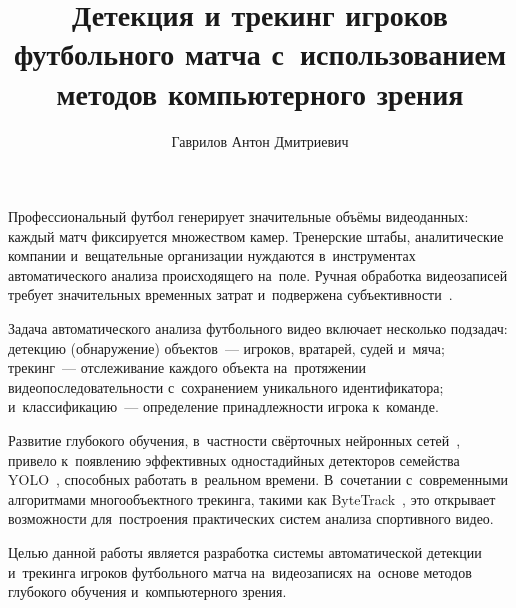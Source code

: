 \documentclass{stud-conf-pmk}
\begin{document}

\begin{paper}
\author[Гаврилов А.\,Д.]{Гаврилов Антон Дмитриевич}
\title{Детекция и трекинг игроков футбольного матча с~использованием методов компьютерного зрения}
\maketitle

\introduction

Профессиональный футбол генерирует значительные объёмы видеоданных: каждый матч фиксируется множеством камер. Тренерские штабы, аналитические компании и~вещательные организации нуждаются в~инструментах автоматического анализа происходящего на~поле. Ручная обработка видеозаписей требует значительных временных затрат и~подвержена субъективности~\cite{bib_sports_cv}.

Задача автоматического анализа футбольного видео включает несколько подзадач: детекцию (обнаружение) объектов~--- игроков, вратарей, судей и~мяча; трекинг~--- отслеживание каждого объекта на~протяжении видеопоследовательности с~сохранением уникального идентификатора; и~классификацию~--- определение принадлежности игрока к~команде.

Развитие глубокого обучения, в~частности свёрточных нейронных сетей~\cite{bib_goodfellow}, привело к~появлению эффективных одностадийных детекторов семейства YOLO~\cite{bib_yolo_original}, способных работать в~реальном времени. В~сочетании с~современными алгоритмами многообъектного трекинга, такими как ByteTrack~\cite{bib_bytetrack}, это открывает возможности для~построения практических систем анализа спортивного видео.

Целью данной работы является разработка системы автоматической детекции и~трекинга игроков футбольного матча на~видеозаписях на~основе методов глубокого обучения и~компьютерного зрения.



\end{paper}
\end{document}
